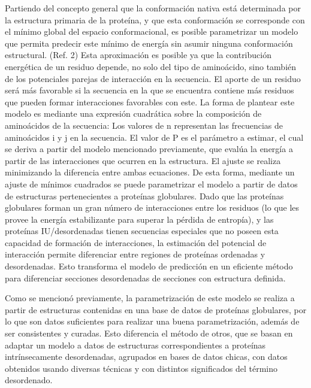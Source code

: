 Partiendo del concepto general que la conformación nativa está determinada por la estructura primaria de la proteína, y que esta conformación se corresponde con el mínimo global del
espacio conformacional, es posible parametrizar un modelo que permita predecir este mínimo de energía sin asumir ninguna conformación estructural. (Ref. 2)
Esta aproximación es posible ya que la contribución energética de un residuo depende, no solo del tipo de aminoácido, sino también de los potenciales parejas de interacción en la secuencia. 
El aporte de un residuo será más favorable si la secuencia en la que se encuentra contiene más residuos que pueden formar interacciones favorables con este. 
La forma de plantear este modelo es mediante una expresión cuadrática sobre la composición de aminoácidos de la secuencia:
Los valores de n representan las frecuencias de aminoácidos i y j en la secuencia.
El valor de P es el parámetro a estimar, el cual se deriva a partir del modelo mencionado previamente, que evalúa la energía a partir de las interacciones que ocurren en la estructura. 
El ajuste se realiza minimizando la diferencia entre ambas ecuaciones.
De esta forma, mediante un ajuste de mínimos cuadrados se puede parametrizar el modelo a partir de datos de estructuras pertenecientes a proteínas globulares.
Dado que las proteínas globulares forman un gran número de interacciones entre los residuos (lo que les provee la energía estabilizante para superar la pérdida de entropía), 
y las proteínas IU/desordenadas tienen secuencias especiales que no poseen esta capacidad de formación de interacciones, la estimación del potencial de interacción permite diferenciar entre 
regiones de proteínas ordenadas y desordenadas. Esto transforma el modelo de predicción en un eficiente método para diferenciar secciones desordenadas de secciones con estructura definida.

Como se mencionó previamente, la parametrización de este modelo se realiza a partir de estructuras contenidas en una base de datos de proteínas globulares, 
por lo que son datos suficientes para realizar una buena parametrización, además de ser consistentes y curadas. Esto diferencia el método de otros, que se basan en adaptar 
un modelo a datos de estructuras correspondientes a proteínas intrínsecamente desordenadas, agrupados en bases de datos chicas, con datos obtenidos usando diversas técnicas 
y con distintos significados del término desordenado.
  
  
  

  
  
